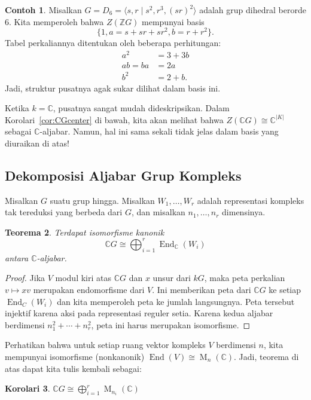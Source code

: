 \documentclass[12pt]{article}
\theoremstyle{plain}
\newtheorem{theorem}{Teorema}[section]
\newtheorem{corollary}[theorem]{Korolari}
\theoremstyle{definition}
\newtheorem{example}[theorem]{Contoh}
\theoremstyle{remark}
\numberwithin{equation}{section}
\begin{document}
\begin{example}
Misalkan $G=D_6=\langle s,r \mid s^2, r^3, (sr)^2 \rangle$
adalah grup dihedral berorde $6$.
Kita memperoleh bahwa
$Z(\mathbb{Z}G)$ mempunyai basis
\[
\{ 1, a = s+sr+sr^2, b = r+r^2 \}.
\]
Tabel perkaliannya ditentukan oleh beberapa perhitungan:
\begin{align*}
a^2 &= 3+3b\\
ab=ba &= 2a\\
b^2 &=2+b.
\end{align*}
Jadi, struktur pusatnya agak sukar dilihat dalam basis ini.
\end{example}

Ketika $k=\mathbb{C}$, pusatnya sangat mudah dideskripsikan.
Dalam Korolari~\ref{cor:CGcenter} di bawah, kita akan melihat bahwa
$Z(\mathbb{C}G) \cong \mathbb{C}^{|K|}$ sebagai $\mathbb{C}$-aljabar.
Namun, hal ini sama sekali tidak jelas dalam
basis yang diuraikan di atas!

\subsection{Dekomposisi Aljabar Grup Kompleks}

Misalkan $G$ suatu grup hingga.
Misalkan $W_1,\ldots,W_r$ adalah representasi
kompleks tak tereduksi yang berbeda dari $G$,
dan misalkan $n_1,\ldots, n_r$ dimensinya.

\begin{theorem}
Terdapat isomorfisme kanonik
\[
\mathbb{C}G \cong \bigoplus_{i=1}^r \operatorname{End}_{\mathbb{C}}(W_i)
\]
antara $\mathbb{C}$-aljabar.
\end{theorem}

\begin{proof}
Jika $V$ modul kiri atas $\mathbb{C}G$ dan $x$ unsur dari $kG$,
maka peta perkalian $v \mapsto xv$ merupakan endomorfisme
dari $V$.
Ini memberikan peta dari $\mathbb{C}G$ ke setiap
$\operatorname{End}_C(W_i)$ dan kita memperoleh
peta ke jumlah langsungnya.
Peta tersebut injektif karena aksi pada representasi reguler
setia.
Karena kedua aljabar berdimensi $n_1^2+\cdots+n_r^2$,
peta ini harus merupakan isomorfisme.
\end{proof}

Perhatikan bahwa untuk setiap ruang vektor kompleks $V$ berdimensi $n$, kita mempunyai
isomorfisme (nonkanonik)
$\operatorname{End}(V) \cong \operatorname{M}_n(\mathbb{C})$.
Jadi, teorema di atas dapat kita tulis kembali sebagai:  

\begin{corollary} \label{cor:fourier_as_matrices}
$\displaystyle
\mathbb{C}G \cong \bigoplus_{i=1}^r \operatorname{M}_{n_i}(\mathbb{C})$
\end{corollary}
\end{document}
